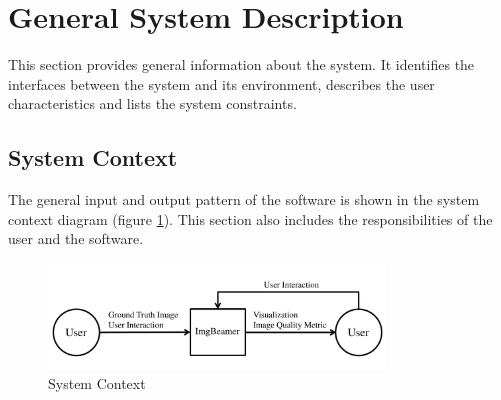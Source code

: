 \documentclass[12pt]{article}
\begin{document}
\section{General System Description}

This section provides general information about the system.  It identifies the
interfaces between the system and its environment, describes the user
characteristics and lists the system constraints.

\subsection{System Context}

The general input and output pattern of the \progname{} software is shown in the 
system context diagram (figure \ref{Fig_SystemContext}). This section also 
includes the responsibilities of the user and the software.

\begin{figure}[h!]
\begin{center}
 \includegraphics[width=0.8\textwidth]{SystemContextFigure}
\caption{System Context}
\label{Fig_SystemContext} 
\end{center}
\end{figure}
\end{document}
